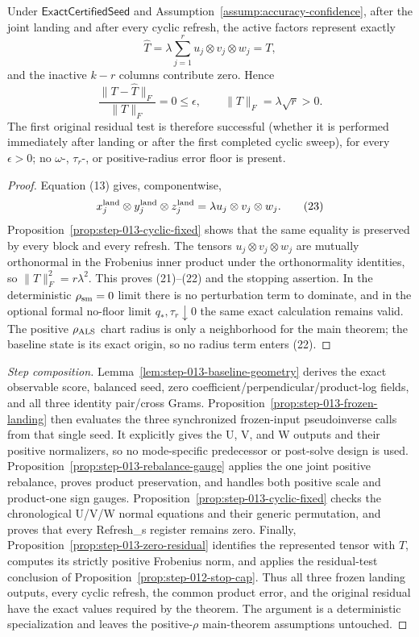 \begin{proposition}\label{prop:step-013-zero-residual}
Under \(\mathsf{ExactCertifiedSeed}\) and
Assumption~\ref{assump:accuracy-confidence}, after the joint landing and
after every cyclic refresh, the active factors represent exactly
\[
\widehat T
=\lambda\sum_{j=1}^r u_j\otimes v_j\otimes w_j=T,
\tag{21}
\]
and the inactive \(k-r\) columns contribute zero. Hence
\[
\frac{\|T-\widehat T\|_F}{\|T\|_F}=0\le\epsilon,\qquad
\|T\|_F=\lambda\sqrt r>0.
\tag{22}
\]
The first original residual test is therefore successful (whether it is
performed immediately after landing or after the first completed cyclic
sweep), for every \(\epsilon>0\); no \(\omega\)-, \(\tau_r\)-, or positive-radius
error floor is present.

\begin{proof}
Equation (13) gives, componentwise,
\[
x_j^{\rm land}\otimes y_j^{\rm land}\otimes z_j^{\rm land}
=\lambda u_j\otimes v_j\otimes w_j.
\tag{23}
\]
Proposition~\ref{prop:step-013-cyclic-fixed} shows that the same equality is
preserved by every block and every refresh. The tensors
\(u_j\otimes v_j\otimes w_j\) are mutually orthonormal in the Frobenius inner
product under the orthonormality identities, so \(\|T\|_F^2=r\lambda^2\). This proves (21)--(22) and
the stopping assertion. In the deterministic \(\rho_{\rm sm}=0\) limit
there is no perturbation term to dominate, and in the optional formal
no-floor limit \(q_*,\tau_r\downarrow0\) the same exact calculation remains
valid. The positive \(\rho_{\rm ALS}\) chart radius is only a neighborhood
for the main theorem; the baseline state is its exact origin, so no radius
term enters (22).


\end{proof}
\end{proposition}
\begin{proof}[Step composition]
Lemma~\ref{lem:step-013-baseline-geometry} derives the exact observable score,
balanced seed, zero coefficient/perpendicular/product-log fields, and all
three identity pair/cross Grams. Proposition~\ref{prop:step-013-frozen-landing}
then evaluates the three synchronized frozen-input pseudoinverse calls from
that single seed. It explicitly gives the U, V, and W outputs and their
positive normalizers, so no mode-specific predecessor or post-solve design is
used. Proposition~\ref{prop:step-013-rebalance-gauge} applies the one joint
positive rebalance, proves product preservation, and handles both positive
scale and product-one sign gauges. Proposition~\ref{prop:step-013-cyclic-fixed}
checks the chronological U/V/W normal equations and their generic permutation,
and proves that every Refresh\_s register remains zero. Finally,
Proposition~\ref{prop:step-013-zero-residual} identifies the represented tensor
with \(T\), computes its strictly positive Frobenius norm, and applies the
residual-test conclusion of Proposition~\ref{prop:step-012-stop-cap}. Thus all three frozen landing
outputs, every cyclic refresh, the common product error, and the original
residual have the exact values required by the theorem. The argument is a
deterministic specialization and leaves the positive-\(\rho\) main-theorem
assumptions untouched.
\end{proof}


